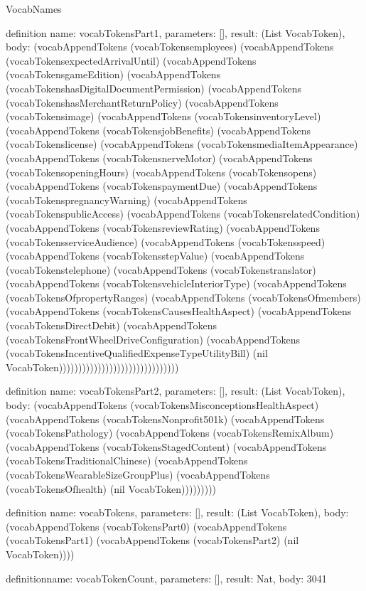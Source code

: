 \begin{lexlean}{VocabNames}
\begin{semanticmodule}
definition{
  name: vocabTokensPart1,
  parameters: [],
  result: (List VocabToken),
  body: (vocabAppendTokens (vocabTokensemployees) (vocabAppendTokens (vocabTokensexpectedArrivalUntil) (vocabAppendTokens (vocabTokensgameEdition) (vocabAppendTokens (vocabTokenshasDigitalDocumentPermission) (vocabAppendTokens (vocabTokenshasMerchantReturnPolicy) (vocabAppendTokens (vocabTokensimage) (vocabAppendTokens (vocabTokensinventoryLevel) (vocabAppendTokens (vocabTokensjobBenefits) (vocabAppendTokens (vocabTokenslicense) (vocabAppendTokens (vocabTokensmediaItemAppearance) (vocabAppendTokens (vocabTokensnerveMotor) (vocabAppendTokens (vocabTokensopeningHours) (vocabAppendTokens (vocabTokensopens) (vocabAppendTokens (vocabTokenspaymentDue) (vocabAppendTokens (vocabTokenspregnancyWarning) (vocabAppendTokens (vocabTokenspublicAccess) (vocabAppendTokens (vocabTokensrelatedCondition) (vocabAppendTokens (vocabTokensreviewRating) (vocabAppendTokens (vocabTokensserviceAudience) (vocabAppendTokens (vocabTokensspeed) (vocabAppendTokens (vocabTokensstepValue) (vocabAppendTokens (vocabTokenstelephone) (vocabAppendTokens (vocabTokenstranslator) (vocabAppendTokens (vocabTokensvehicleInteriorType) (vocabAppendTokens (vocabTokensOfpropertyRanges) (vocabAppendTokens (vocabTokensOfmembers) (vocabAppendTokens (vocabTokensCausesHealthAspect) (vocabAppendTokens (vocabTokensDirectDebit) (vocabAppendTokens (vocabTokensFrontWheelDriveConfiguration) (vocabAppendTokens (vocabTokensIncentiveQualifiedExpenseTypeUtilityBill) (nil VocabToken)))))))))))))))))))))))))))))))
}

definition{
  name: vocabTokensPart2,
  parameters: [],
  result: (List VocabToken),
  body: (vocabAppendTokens (vocabTokensMisconceptionsHealthAspect) (vocabAppendTokens (vocabTokensNonprofit501k) (vocabAppendTokens (vocabTokensPathology) (vocabAppendTokens (vocabTokensRemixAlbum) (vocabAppendTokens (vocabTokensStagedContent) (vocabAppendTokens (vocabTokensTraditionalChinese) (vocabAppendTokens (vocabTokensWearableSizeGroupPlus) (vocabAppendTokens (vocabTokensOfhealth) (nil VocabToken)))))))))
}

definition{
  name: vocabTokens,
  parameters: [],
  result: (List VocabToken),
  body: (vocabAppendTokens (vocabTokensPart0) (vocabAppendTokens (vocabTokensPart1) (vocabAppendTokens (vocabTokensPart2) (nil VocabToken))))
}

definition{name: vocabTokenCount, parameters: [], result: Nat, body: 3041}
\end{semanticmodule}
\end{lexlean}
